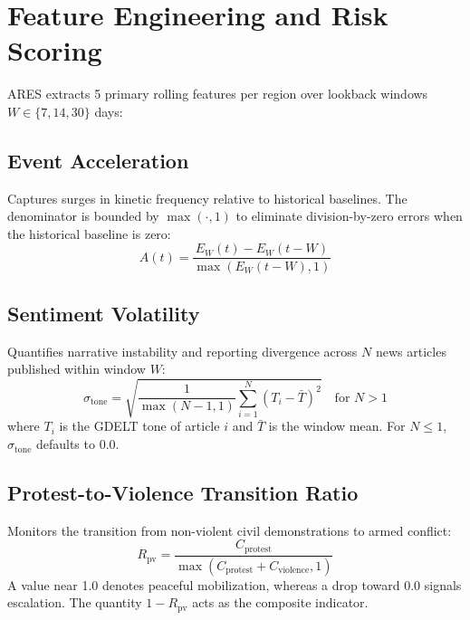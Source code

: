 \documentclass[preprint,12pt]{elsarticle}
\begin{document}
\section{Feature Engineering and Risk Scoring}
\label{sec:features}

ARES extracts 5 primary rolling features per region over lookback windows $W \in \{7, 14, 30\}$ days:

\subsection{Event Acceleration}
Captures surges in kinetic frequency relative to historical baselines. The denominator is bounded by $\max(\cdot, 1)$ to eliminate division-by-zero errors when the historical baseline is zero:
\begin{equation}
A(t) = \frac{E_W(t) - E_W(t-W)}{\max(E_W(t-W), 1)}
\end{equation}

\subsection{Sentiment Volatility}
Quantifies narrative instability and reporting divergence across $N$ news articles published within window $W$:
\begin{equation}
\sigma_{\text{tone}} = \sqrt{\frac{1}{\max(N-1, 1)} \sum_{i=1}^N (T_i - \bar{T})^2} \quad \text{for } N > 1
\end{equation}
where $T_i$ is the GDELT tone of article $i$ and $\bar{T}$ is the window mean. For $N \le 1$, $\sigma_{\text{tone}}$ defaults to $0.0$.

\subsection{Protest-to-Violence Transition Ratio}
Monitors the transition from non-violent civil demonstrations to armed conflict:
\begin{equation}
R_{\text{pv}} = \frac{C_{\text{protest}}}{\max(C_{\text{protest}} + C_{\text{violence}}, 1)}
\end{equation}
A value near 1.0 denotes peaceful mobilization, whereas a drop toward 0.0 signals escalation. The quantity $1 - R_{\text{pv}}$ acts as the composite indicator.
\end{document}
